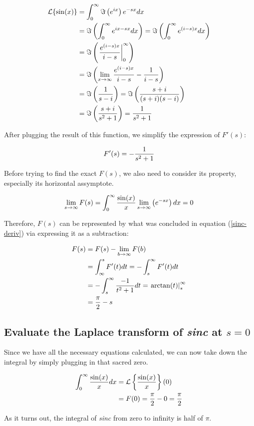 $$
\begin{aligned}
	\mathcal{L}\{\sin(x)\}&=\int_0^\infty\Im\left(e^{ix}\right)e^{-sx}dx \\
	&=\Im\left(\int_0^\infty e^{ix-sx}dx\right)
	=\Im\left(\int_0^\infty e^{(i-s)x}dx\right) \\
	&=\Im\left(\left.e^{(i-s)x}\over i-s\right|_0^\infty\right) \\
	&=\Im\left(\lim_{x\to\infty}{e^{(i-s)x}\over i-s}-{1\over i-s}\right) \\
	&=\Im\left(1\over s-i\right)=\Im\left(s+i\over(s+i)(s-i)\right) \\
	&=\Im\left(s+i\over s^2+1\right)={1\over s^2+1}
\end{aligned}
$$

After plugging the result of this function, we simplify the expression of
$F'(s)$:

\begin{equation}
	F'(s)=-{1\over s^2+1}
	\label{sinc-deriv}
\end{equation}

Before trying to find the exact $F(s)$, we also need to consider its property,
especially its horizontal assymptote.

$$
\lim_{s\to\infty}F(s)=\int_0^\infty{\sin(x)\over x}
\lim_{s\to\infty}\left(e^{-sx}\right)dx=0
$$

Therefore, $F(s)$ can be represented by what was concluded in equation
(\ref{sinc-deriv}) via expressing it as a subtraction:

$$
\begin{aligned}
	F(s)&=F(s)-\lim_{b\to\infty}F(b) \\
	&=\int_\infty^sF'(t)dt=-\int_s^\infty F'(t)dt \\
	&=-\int_s^\infty{-1\over t^2+1}dt=\left.\arctan(t)\right|_s^\infty \\
	&={\pi\over 2}-s
\end{aligned}
$$

\subsection{Evaluate the Laplace transform of \textit{sinc} at $s=0$}

Since we have all the necessary equations calculated, we can now take down the
integral by simply plugging in that sacred zero.

$$
\begin{aligned}
	\int_0^\infty{\sin(x)\over x}dx&=\mathcal{L}\left\{\sin(x)\over x\right\}(0) \\
	&=F(0)={\pi\over2}-0={\pi\over2}
\end{aligned}
$$

As it turns out, the integral of \textit{sinc} from zero to infinity is half of
$\pi$.
